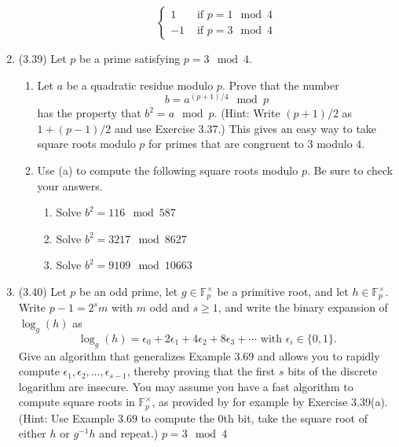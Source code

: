 \documentclass[12pt]{amsart}
\theoremstyle{definition}
\begin{document}
\begin{enumerate}
\begin{enumerate}
\begin{displaymath}
				\begin{cases} 
					1 & \text{ if } p = 1 \mod 4 \\
					-1 & \text{ if } p = 3 \mod 4 
				\end{cases}
		\end{displaymath}
	\end{enumerate} 
	\item (3.39) Let $p$ be a prime satisfying $p = 3 \mod 4$. 
	\begin{enumerate}
		\item Let $a$ be a quadratic residue modulo $p$. Prove that 
			the number 
		\begin{displaymath}
			b = a^{(p+1)/4} \mod p 
		\end{displaymath}
		has the property that $b^2 = a \mod p$. (Hint: Write $(p+1)/2$ 
		as $1 + (p-1)/2$ and use Exercise 3.37.) This gives an easy way 
		to take square roots modulo $p$ for primes that are congruent 
		to $3$ modulo $4$.
		\item Use (a) to compute the following square roots modulo $p$. 
			Be sure to check your answers. 
		\begin{enumerate}
			\item Solve $b^2 = 116 \mod 587$ 
			\item Solve $b^2 = 3217 \mod 8627$ 
			\item Solve $b^2 = 9109 \mod 10663$ 
		\end{enumerate}
	\end{enumerate}
	\item (3.40) Let $p$ be an odd prime, let $g \in \mathbb{F}_p^\times$ be 
		a primitive root, and let $h \in \mathbb{F}_p^\times$. Write 
		$p-1 = 2^s m$ with $m$ odd and $s \geq 1$, and write the binary 
		expansion of $\log_g(h)$ as 
	\begin{displaymath}
		\log_g(h) = \epsilon_0 + 2 \epsilon_1 + 4 \epsilon_2 + 8 \epsilon_3 
		+ \cdots \text{ with } \epsilon_i \in \lbrace 0,1 \rbrace. 
	\end{displaymath}
		Give an algorithm that generalizes Example 3.69 and allows you to 
		rapidly compute $\epsilon_1, \epsilon_2,\ldots, \epsilon_{s-1}$, 
		thereby proving that the first $s$ bits of the discrete logarithm 
		are insecure. You may assume you have a fast algorithm to compute 
		square roots in $\mathbb{F}_p^\times$, as provided by for example 
		by Exercise 3.39(a). (Hint: Use Example 3.69 to compute the 0th 
		bit, take the square root of either $h$ or $g^{-1}h$ and repeat.)
		$p = 3 \mod 4$
\end{enumerate}
\end{document}
